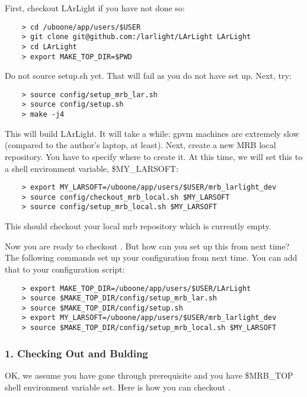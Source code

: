 First, checkout LArLight if you have not done so:
\begin{lstlisting}
    > cd /uboone/app/users/$USER
    > git clone git@github.com:/larlight/LArLight LArLight
    > cd LArLight
    > export MAKE_TOP_DIR=$PWD
\end{lstlisting}
Do not source {\ttfamily setup.sh} yet. 
That will fail as you do not have \ROOT set up. Next, try:
\begin{lstlisting}
    > source config/setup_mrb_lar.sh
    > source config/setup.sh
    > make -j4
\end{lstlisting}
This will build LArLight. It will take a while: gpvm machines are extremely slow (compared to the author's laptop, at least).
Next, create a new MRB local repository. 
You have to specify where to create it. At this time, we will set this to
a shell environment variable, {\ttfamily \$MY\_LARSOFT}:
\begin{lstlisting}
    > export MY_LARSOFT=/uboone/app/users/$USER/mrb_larlight_dev
    > source config/checkout_mrb_local.sh $MY_LARSOFT
    > source config/setup_mrb_local.sh $MY_LARSOFT
\end{lstlisting}
This should checkout your local mrb repository which is currently empty.

Now you are ready to checkout \DataScanner. But how can you set up this
from next time? The following commands set up your configuration from 
next time. You can add that to your configuration script:
\begin{lstlisting}
    > export MAKE_TOP_DIR=/uboone/app/users/$USER/LArLight
    > source $MAKE_TOP_DIR/config/setup_mrb_lar.sh
    > source $MAKE_TOP_DIR/config/setup.sh
    > export MY_LARSOFT=/uboone/app/users/$USER/mrb_larlight_dev
    > source $MAKE_TOP_DIR/config/setup_mrb_local.sh $MY_LARSOFT
\end{lstlisting}



\subsubsection{1. Checking Out and Bulding \DataScanner}
OK, we assume you have gone through prerequisite and you have {\ttfamily \$MRB\_TOP} shell environment variable set. Here is how you can checkout \DataScanner.

